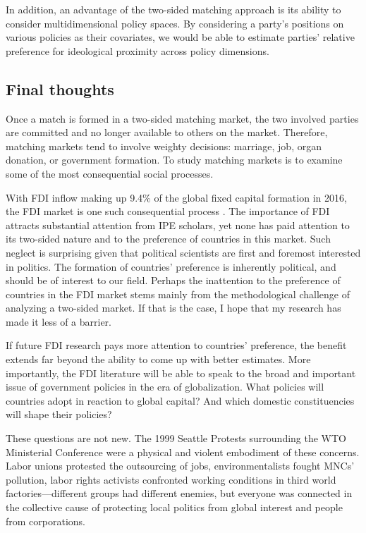 In addition, an advantage of the two-sided matching approach is its ability to
consider multidimensional policy spaces. By considering a party's positions on
various policies as their covariates, we would be able to estimate parties'
relative preference for ideological proximity across policy dimensions.

\subsection{Final thoughts}

Once a match is formed in a two-sided matching market, the two involved parties
are committed and no longer available to others on the market. Therefore,
matching markets tend to involve weighty decisions: marriage, job, organ
donation, or government formation. To study matching markets is to examine some
of the most consequential social processes.

With FDI inflow making up 9.4\% of the global fixed capital formation in 2016,
the FDI market is one such consequential process \citep{UNCTAD2017}. The
importance of FDI attracts substantial attention from IPE scholars, yet none has
paid attention to its two-sided nature and to the preference of countries in
this market. Such neglect is surprising given that political scientists are
first and foremost interested in politics. The formation of countries'
preference is inherently political, and should be of interest to our field.
Perhaps the inattention to the preference of countries in the FDI market stems
mainly from the methodological challenge of analyzing a two-sided market. If
that is the case, I hope that my research has made it less of a barrier.

If future FDI research pays more attention to countries' preference, the benefit
extends far beyond the ability to come up with better estimates. More
importantly, the FDI literature will be able to speak to the broad and important
issue of government policies in the era of globalization. What policies will
countries adopt in reaction to global capital? And which domestic
constituencies will shape their policies?

These questions are not new. The 1999 Seattle Protests surrounding the WTO
Ministerial Conference were a physical and violent embodiment of these concerns.
Labor unions protested the outsourcing of jobs, environmentalists fought MNCs'
pollution, labor rights activists confronted working conditions in third world
factories---different groups had different enemies, but everyone was connected
in the collective cause of protecting local politics from global interest and
people from corporations.


